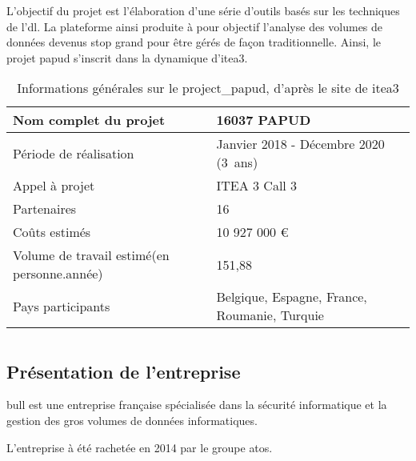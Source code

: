 L'objectif du projet  est l'élaboration d'une série d'outils basés sur les techniques de l'\gls{dl}.
La plateforme ainsi produite à pour objectif l'analyse des volumes de données devenus stop grand pour être gérés de façon traditionnelle.
Ainsi, le projet \gls{papud} s'inscrit dans la dynamique d'\gls{itea3}.

\begin{table}[h]{
	\centering
	\renewcommand{\arraystretch}{1.5}
	\setlength\tabcolsep{1em}
	\begin{tabularx}{\textwidth}{|X|l|}
		\hline
		Nom complet du projet & 16037 PAPUD\\
		\hline
		Période de réalisation & Janvier 2018 - Décembre 2020 (3~ans)\\
		\hline
		Appel à projet & ITEA 3 Call 3\\
		\hline
		Partenaires & 16\\
		\hline
		Coûts estimés & 10 927 000 €\\
		\hline
		Volume de travail estimé\newline (en personne.année) & 151,88 \\
		\hline
		Pays participants & Belgique, Espagne, France, \mbox{Roumanie}, Turquie\\
		\hline
	\end{tabularx}
	\renewcommand{\arraystretch}{1}}
	\caption[Informations générales sur le \gls{project_papud}, d'après le site de \gls{itea3}]{Informations générales sur le \gls{project_papud}, d'après le site de \gls{itea3} \autocite{about_papud} \label{tab:about_papud}}
\end{table}

\section{}
\subsection*{Présentation de l'entreprise}
\gls{bull} est une entreprise française spécialisée dans la sécurité informatique et la gestion des gros volumes de données informatiques. 

L'entreprise à été rachetée en 2014 par le groupe \gls{atos}.

